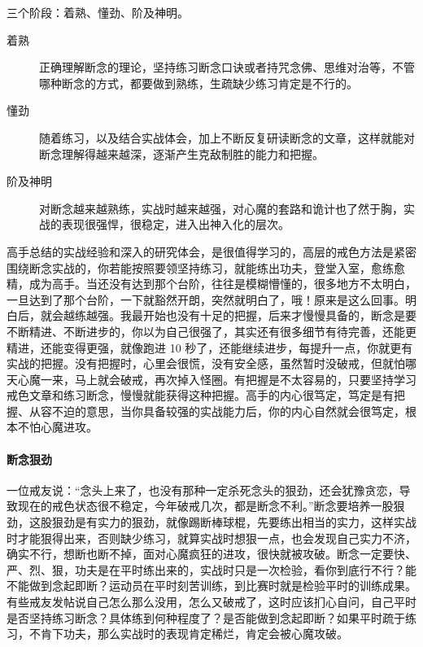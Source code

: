 三个阶段：着熟、懂劲、阶及神明。

\begin{description}
    \item[着熟] 正确理解断念的理论，坚持练习断念口诀或者持咒念佛、思维对治等，不管哪种断念的方式，都要做到熟练，生疏缺少练习肯定是不行的。
    \item[懂劲] 随着练习，以及结合实战体会，加上不断反复研读断念的文章，这样就能对断念理解得越来越深，逐渐产生克敌制胜的能力和把握。
    \item[阶及神明] 对断念越来越熟练，实战时越来越强，对心魔的套路和诡计也了然于胸，实战的表现很强悍，很稳定，进入出神入化的层次。
\end{description}

高手总结的实战经验和深入的研究体会，是很值得学习的，高层的戒色方法是紧密围绕断念实战的，你若能按照要领坚持练习，就能练出功夫，登堂入室，愈练愈精，成为高手。当还没有达到那个台阶，往往是模糊懵懂的，很多地方不太明白，一旦达到了那个台阶，一下就豁然开朗，突然就明白了，哦！原来是这么回事。明白后，就会越练越强。我最开始也没有十足的把握，后来才慢慢具备的，断念是要不断精进、不断进步的，你以为自己很强了，其实还有很多细节有待完善，还能更精进，还能变得更强，就像跑进 10 秒了，还能继续进步，每提升一点，你就更有实战的把握。没有把握时，心里会很慌，没有安全感，虽然暂时没破戒，但就怕哪天心魔一来，马上就会破戒，再次掉入怪圈。有把握是不太容易的，只要坚持学习戒色文章和练习断念，慢慢就能获得这种把握。高手的内心很笃定，笃定是有把握、从容不迫的意思，当你具备较强的实战能力后，你的内心自然就会很笃定，根本不怕心魔进攻。

\paragraph{断念狠劲}

一位戒友说：“念头上来了，也没有那种一定杀死念头的狠劲，还会犹豫贪恋，导致现在的戒色状态很不稳定，今年破戒几次，都是断念不利。”断念要培养一股狠劲，这股狠劲是有实力的狠劲，就像踢断棒球棍，先要练出相当的实力，这样实战时才能狠得出来，否则缺少练习，就算实战时想狠一点，也会发现自己实力不济，确实不行，想断也断不掉，面对心魔疯狂的进攻，很快就被攻破。断念一定要快、严、烈、狠，功夫是在平时练出来的，实战时只是一次检验，看你到底行不行？能不能做到念起即断？运动员在平时刻苦训练，到比赛时就是检验平时的训练成果。有些戒友发帖说自己怎么那么没用，怎么又破戒了，这时应该扪心自问，自己平时是否坚持练习断念？具体练到何种程度了？是否能做到念起即断？如果平时疏于练习，不肯下功夫，那么实战时的表现肯定稀烂，肯定会被心魔攻破。

